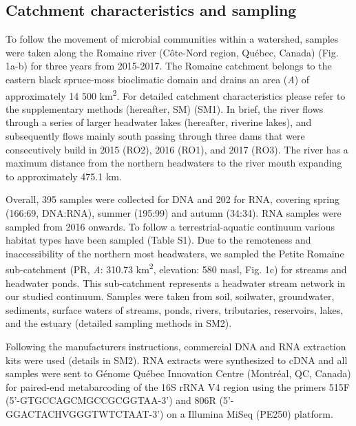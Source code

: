 \documentclass[12pt,a4paper]{article} %
\begin{document}
\subsection*{Catchment characteristics and sampling}
To follow the movement of microbial communities within a watershed, samples were taken along the Romaine river (C\^{o}te-Nord region, Qu\'{e}bec, Canada) (Fig. 1a-b) for three years from 2015-2017. The Romaine catchment belongs to the eastern black spruce-moss bioclimatic domain and drains an area (\textit{A}) of approximately 14 500 km\textsuperscript{2}. For detailed catchment characteristics please refer to the supplementary methods (hereafter, SM) (SM1). In brief, the river flows through a series of larger headwater lakes (hereafter, riverine lakes), and subsequently flows mainly south passing through three dams that were consecutively build in 2015 (RO2), 2016 (RO1), and 2017 (RO3). The river has a maximum distance from the northern headwaters to the river mouth expanding to approximately 475.1 km.

Overall, 395 samples were collected for DNA and 202 for RNA, covering spring (166:69, DNA:RNA), summer (195:99) and autumn (34:34). RNA samples were sampled from 2016 onwards. To follow a terrestrial-aquatic continuum various habitat types have been sampled (Table S1). Due to the remoteness and inaccessibility of the northern most headwaters, we sampled the Petite Romaine sub-catchment (PR, \textit{A}: 310.73 km\textsuperscript{2}, elevation: 580 masl, Fig. 1c) for streams and headwater ponds. This sub-catchment represents a headwater stream network in our studied continuum. Samples were taken from soil, soilwater, groundwater, sediments, surface waters of streams, ponds, rivers, tributaries, reservoirs, lakes, and the estuary (detailed sampling methods in SM2).

Following the manufacturers instructions, commercial DNA and RNA extraction kits were used (details in SM2). RNA extracts were synthesized to cDNA and all samples were sent to G\'{e}nome Qu\'{e}bec Innovation Centre (Montr\'{e}al, QC, Canada) for paired-end metabarcoding of the 16S rRNA V4 region using the primers 515F (5'-GTGCCAGCMGCCGCGGTAA-3') and 806R (5'-GGACTACHVGGGTWTCTAAT-3') on a Illumina MiSeq (PE250) platform.
\end{document}

